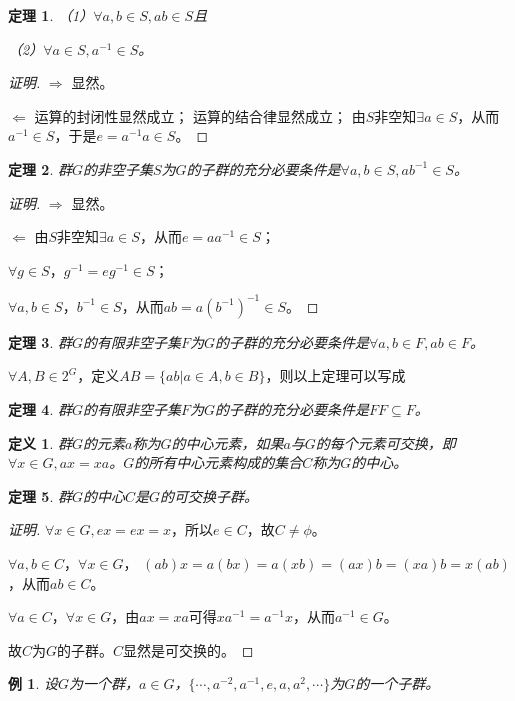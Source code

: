 \documentclass{article}
\newtheorem{Def}{定义}
\newtheorem{Thm}{定理}
\newtheorem*{Example}{例}
\begin{document}
\begin{CJK*}{UTF8}{gbsn}
\begin{Thm}
  （1）$\forall a,b\in S, ab\in S$且

  （2）$\forall a\in S, a^{-1}\in S$。
 \end{Thm}
\begin{proof}[证明]
  $\Rightarrow$ 显然。

  $\Leftarrow$
  运算的封闭性显然成立；
  运算的结合律显然成立；
  由$S$非空知$\exists a\in S$，从而$a^{-1}\in S$，于是$e=a^{-1}a\in S$。
\end{proof}
 \begin{Thm}
  群$G$的非空子集$S$为$G$的子群的充分必要条件是$\forall a,b\in S, ab^{-1}\in S$。
 \end{Thm}
 \begin{proof}[证明]
  $\Rightarrow$ 显然。

  $\Leftarrow$
  由$S$非空知$\exists a\in S$，从而$e=aa^{-1}\in S$；

  $\forall g\in S$，$g^{-1}=eg^{-1}\in S$；

  $\forall a,b\in S$，$b^{-1}\in S$，从而$ab=a(b^{-1})^{-1}\in S$。
\end{proof}

 \begin{Thm}
  群$G$的有限非空子集$F$为$G$的子群的充分必要条件是$\forall a,b\in F, ab\in F$。
 \end{Thm}

 $\forall A,B\in 2^G$，定义$AB=\{ab|a\in A,b\in B\}$，则以上定理可以写成

 \begin{Thm}
  群$G$的有限非空子集$F$为$G$的子群的充分必要条件是$FF\subseteq F$。
 \end{Thm}
 \begin{Def}
  群$G$的元素$a$称为$G$的中心元素，如果$a$与$G$的每个元素可交换，即$\forall x\in G, ax=xa$。$G$的所有中心元素构成的集合$C$称为$G$的中心。
 \end{Def}
 \begin{Thm}
  群$G$的中心$C$是$G$的可交换子群。
 \end{Thm}
\begin{proof}[证明]
$\forall x\in G, ex=ex=x$，所以$e\in C$，故$C\neq \phi$。

$\forall a,b\in C$，$\forall x\in G$，
$(ab)x=a(bx)=a(xb)=(ax)b=(xa)b=x(ab)$，从而$ab\in C$。

$\forall a\in C$，$\forall x\in G$，由$ax=xa$可得$xa^{-1}=a^{-1}x$，从而$a^{-1}\in G$。

故$C$为$G$的子群。$C$显然是可交换的。
\end{proof}
\begin{Example}
  设$G$为一个群，$a\in G$，$\{\cdots,a^{-2},a^{-1},e,a,a^2,\cdots\}$为$G$的一个子群。
\end{Example}


\end{CJK*}
\end{document}
